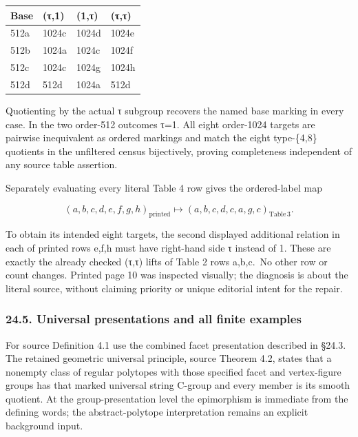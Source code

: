 \documentclass[
  10pt,
  letterpaper,
]{article}
\newcounter{none} %
\begin{document}
{\def\LTcaptype{none} %
\begin{longtable}[]{@{}llll@{}}
\toprule\noalign{}
Base & (τ,1) & (1,τ) & (τ,τ) \\
\midrule\noalign{}
\endhead
\bottomrule\noalign{}
\endlastfoot
512a & 1024c & 1024d & 1024e \\
512b & 1024a & 1024c & 1024f \\
512c & 1024c & 1024g & 1024h \\
512d & 512d & 1024a & 512d \\
\end{longtable}
}

Quotienting by the actual τ subgroup recovers the named base marking in
every case. In the two order-512 outcomes τ=1. All eight order-1024
targets are pairwise inequivalent as ordered markings and match the
eight type-\{4,8\} quotients in the unfiltered census bijectively,
proving completeness independent of any source table assertion.

Separately evaluating every literal Table 4 row gives the ordered-label
map

\[
(a,b,c,d,e,f,g,h)_{\mathrm{printed}}
\longmapsto(a,b,c,d,c,a,g,c)_{\mathrm{Table\,3}}.
\tag{N2}
\]

To obtain its intended eight targets, the second displayed additional
relation in each of printed rows e,f,h must have right-hand side τ
instead of 1. These are exactly the already checked (τ,τ) lifts of Table
2 rows a,b,c.~No other row or count changes. Printed page 10 was
inspected visually; the diagnosis is about the literal source, without
claiming priority or unique editorial intent for the repair.

\subsubsection{24.5. Universal presentations and all finite
examples}\label{universal-presentations-and-all-finite-examples}

For source Definition 4.1 use the combined facet presentation described
in §24.3. The retained geometric universal principle, source Theorem
4.2, states that a nonempty class of regular polytopes with those
specified facet and vertex-figure groups has that marked universal
string C-group and every member is its smooth quotient. At the
group-presentation level the epimorphism is immediate from the defining
words; the abstract-polytope interpretation remains an explicit
background input.
\end{document}
